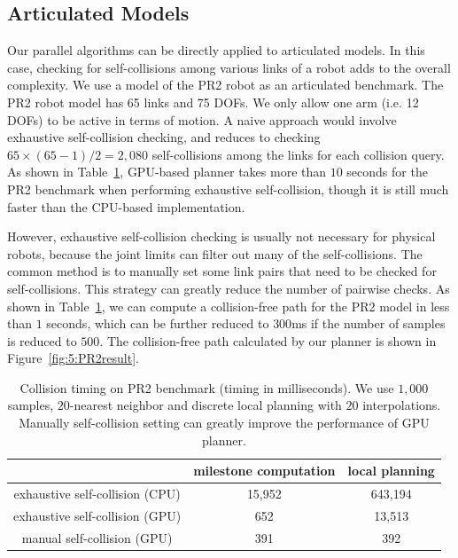 \subsection{Articulated Models}
Our parallel algorithms can be directly applied to articulated models. In this case, checking for self-collisions among
various links of a robot adds to the overall complexity. We use a model of the PR2 robot as an articulated
benchmark. The PR2 robot model has 65 links and 75 DOFs. We only allow one arm (i.e. 12 DOFs) to be active in terms
of motion. A naive approach would involve exhaustive self-collision checking, and reduces to checking
$65 \times (65-1)/2 = 2,080$ self-collisions among the links for each collision query.
As shown in Table~\ref{tab:5:selfcollision}, GPU-based planner takes more than $10$ seconds for the PR2 benchmark when
performing exhaustive self-collision, though it is still much faster than the CPU-based implementation.

However, exhaustive self-collision checking is usually not necessary for  physical robots, because the joint limits can
filter out many of the self-collisions. The common method is to manually set some link pairs that need to be checked
for self-collisions. This strategy can greatly reduce the number of pairwise checks. As shown in Table~\ref{tab:5:selfcollision}, we can compute a collision-free path for the PR2 model in less than $1$ seconds, which can be further reduced to $300$ms if
the number of samples is reduced to $500$. The collision-free path calculated by our planner is shown in Figure~\ref{fig:5:PR2result}.


\begin{table}[htb]
\begin{center}
\begin{tabular}{|c|c|c|} \hline
                                & milestone computation & local planning \\ \hline
exhaustive self-collision (CPU) & 15,952 & 643,194 \\ \hline
exhaustive self-collision (GPU) & 652 & 13,513 \\ \hline
manual self-collision (GPU) & 391 & 392 \\ \hline
\end{tabular}
\end{center}
\caption[Comparison of the collision timing on PR2 benchmark when using CPU-based and GPU-based collision checking algorithms]{Collision timing on PR2 benchmark (timing in milliseconds). We use $1,000$ samples, $20$-nearest neighbor and discrete local planning with $20$ interpolations. Manually self-collision setting can greatly improve the performance of GPU planner. }\label{tab:5:selfcollision}
\end{table}


